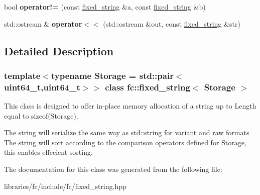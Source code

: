 \begin{DoxyCompactItemize}
\item 
\mbox{\label{classfc_1_1fixed__string_add2c90c3d93a5b908096fc288a15fcf9}} 
bool {\bfseries operator!=} (const \mbox{\hyperlink{classfc_1_1fixed__string}{fixed\+\_\+string}} \&a, const \mbox{\hyperlink{classfc_1_1fixed__string}{fixed\+\_\+string}} \&b)
\item 
\mbox{\label{classfc_1_1fixed__string_ab6c9614c8e29fe2a2a199129d609d7bb}} 
std\+::ostream \& {\bfseries operator$<$$<$} (std\+::ostream \&out, const \mbox{\hyperlink{classfc_1_1fixed__string}{fixed\+\_\+string}} \&str)
\end{DoxyCompactItemize}


\subsection{Detailed Description}
\subsubsection*{template$<$typename Storage = std\+::pair$<$uint64\+\_\+t,uint64\+\_\+t$>$$>$\newline
class fc\+::fixed\+\_\+string$<$ Storage $>$}

This class is designed to offer in-\/place memory allocation of a string up to Length equal to sizeof(\+Storage).

The string will serialize the same way as std\+::string for variant and raw formats The string will sort according to the comparison operators defined for \mbox{\hyperlink{struct_storage}{Storage}}, this enables effecient sorting. 

The documentation for this class was generated from the following file\+:\begin{DoxyCompactItemize}
\item 
libraries/fc/include/fc/fixed\+\_\+string.\+hpp\end{DoxyCompactItemize}
